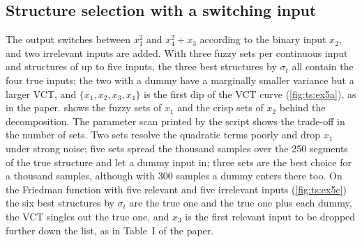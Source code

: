 
\subsection{Structure selection with a switching input}

The output switches between $x_1^2$ and $x_4^2+x_3$ according to the binary input $x_2$, and two irrelevant inputs are added. With three fuzzy sets per continuous input and structures of up to five inputs, the three best structures by $\sigma_t$ all contain the four true inputs; the two with a dummy have a marginally smaller variance but a larger VCT, and $\{x_1,x_2,x_3,x_4\}$ is the first dip of the VCT curve (\cref{fig:ts:ex5a}), as in the paper.  shows the fuzzy sets of $x_1$ and the crisp sets of $x_2$ behind the decomposition. The parameter scan printed by the script shows the trade-off in the number of sets. Two sets resolve the quadratic terms poorly and drop $x_1$ under strong noise; five sets spread the thousand samples over the 250 segments of the true structure and let a dummy input in; three sets are the best choice for a thousand samples, although with 300 samples a dummy enters there too. On the Friedman function with five relevant and five irrelevant inputs (\cref{fig:ts:ex5c}) the six best structures by $\sigma_t$ are the true one and the true one plus each dummy, the VCT singles out the true one, and $x_3$ is the first relevant input to be dropped further down the list, as in Table~I of the paper.

